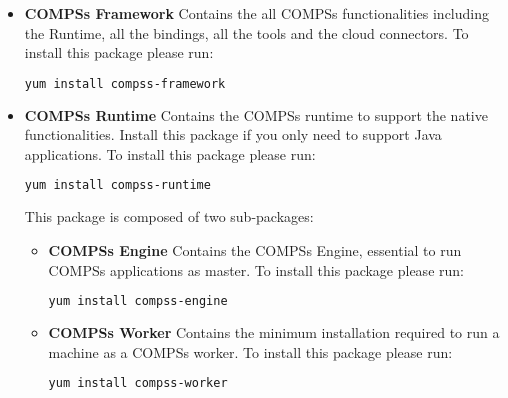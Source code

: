 \begin{itemize}
 \item \textbf{COMPSs Framework} \newline
       Contains the all COMPSs functionalities including the Runtime, all the bindings, all the tools and the cloud connectors.
       \newline
       To install this package please run:
       \begin{lstlisting}[language=bash]
	  yum install compss-framework
       \end{lstlisting}
 \item \textbf{COMPSs Runtime} \newline
       Contains the COMPSs runtime to support the native functionalities. Install this package if you only need to support Java
       applications.
       \newline
       To install this package please run:
       \begin{lstlisting}[language=bash]
	  yum install compss-runtime
       \end{lstlisting}
       This package is composed of two sub-packages:
       \begin{itemize}
        \item \textbf{COMPSs Engine} \newline
	      Contains the COMPSs Engine, essential to run COMPSs applications as master.
	      \newline
	      To install this package please run:
	      \begin{lstlisting}[language=bash]
		  yum install compss-engine
	      \end{lstlisting}
        \item \textbf{COMPSs Worker} \newline
              Contains the minimum installation required to run a machine as a COMPSs worker.
              \newline
              To install this package please run:
	      \begin{lstlisting}[language=bash]
		  yum install compss-worker
	      \end{lstlisting}
       \end{itemize}


\end{itemize}
